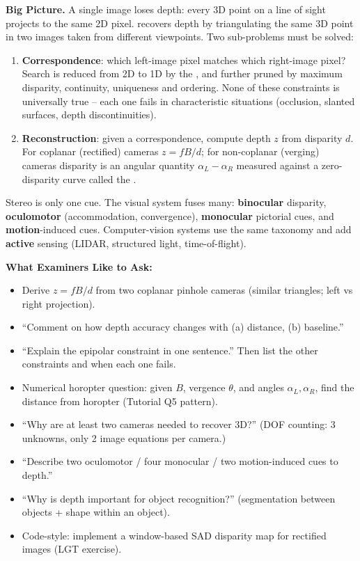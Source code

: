 \textbf{Big Picture.}
A single image loses depth: every 3D point on a line of sight projects to the same 2D pixel.  recovers depth by triangulating the same 3D point in two images taken from different viewpoints. Two sub-problems must be solved:
\begin{enumerate}
  \item \textbf{Correspondence}: which left-image pixel matches which right-image pixel? Search is reduced from 2D to 1D by the , and further pruned by maximum disparity, continuity, uniqueness and ordering. None of these constraints is universally true -- each one fails in characteristic situations (occlusion, slanted surfaces, depth discontinuities).
  \item \textbf{Reconstruction}: given a correspondence, compute depth $z$ from disparity $d$. For coplanar (rectified) cameras $z = fB/d$; for non-coplanar (verging) cameras disparity is an angular quantity $\alpha_L - \alpha_R$ measured against a zero-disparity curve called the .
\end{enumerate}
Stereo is only one cue. The visual system fuses many: \textbf{binocular} disparity, \textbf{oculomotor} (accommodation, convergence), \textbf{monocular} pictorial cues, and \textbf{motion}-induced cues. Computer-vision systems use the same taxonomy and add \textbf{active} sensing (LIDAR, structured light, time-of-flight).

\separator

\textbf{What Examiners Like to Ask:}
\begin{itemize}
  \item Derive $z = fB/d$ from two coplanar pinhole cameras (similar triangles; left vs right projection).
  \item ``Comment on how depth accuracy changes with (a) distance, (b) baseline.''
  \item ``Explain the epipolar constraint in one sentence.'' Then list the other constraints and when each one fails.
  \item Numerical horopter question: given $B$, vergence $\theta$, and angles $\alpha_L, \alpha_R$, find the distance from horopter (Tutorial Q5 pattern).
  \item ``Why are at least two cameras needed to recover 3D?'' (DOF counting: 3 unknowns, only 2 image equations per camera.)
  \item ``Describe two oculomotor / four monocular / two motion-induced cues to depth.''
  \item ``Why is depth important for object recognition?'' (segmentation between objects + shape within an object).
  \item Code-style: implement a window-based SAD disparity map for rectified images (LGT exercise).
\end{itemize}

